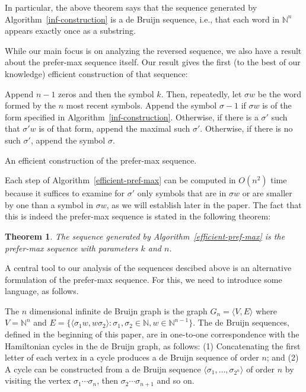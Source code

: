 \documentclass{article}
\newtheorem{theorem}{Theorem}
\theoremstyle{definition}
\newcommand{\N}{{\mathbb{N}}}
\newcommand{\T}[1]{\langle{#1}\rangle}
\begin{document}
In particular, the above theorem says that the sequence generated by Algorithm~\ref{inf-construction} is a de Bruijn sequence, i.e., that each word in $\N^n$ appears exactly once as a substring.

While our main focus is on analyzing the reversed sequence, we also have a result about the prefer-max sequence itself. Our result gives the first (to the best of our knowledge) efficient construction of that sequence:

\begin{algorithm}
	Append $n-1$ zeros and then the symbol $k$. Then, repeatedly, let $\sigma w$ be the word formed by the $n$ most recent symbols. Append the symbol $\sigma-1$  if $\sigma w$  is of the form specified in Algorithm~\ref{inf-construction}. Otherwise, if there is a  $\sigma'$ such that $\sigma'w$ is of that form, append the maximal such $\sigma'$. Otherwise, if there is no such $\sigma'$, append the symbol $\sigma$.
		
	\caption{An efficient construction of the prefer-max sequence.}
	\label{efficient-pref-max}
\end{algorithm}

Each step of Algorithm~\ref{efficient-pref-max} can be computed in $O(n^2)$ time because it suffices to examine for $\sigma'$ only symbols that are in $\sigma w$ or are smaller by one than a symbol in $\sigma w$, as we will establish later in the paper.
The fact that this is indeed the prefer-max sequence is stated in the following theorem:

\begin{theorem}
	The sequence generated by Algorithm~\ref{efficient-pref-max} is the prefer-max sequence with parameters $k$ and $n$.
\end{theorem}
	

A central tool to our analysis of the sequences descibed above is an alternative formulation of the prefer-max sequence. For this, we need to introduce some language, as follows.

The $n$ dimensional infinite de Bruijn graph is the graph $G_{n}=\T{V,E}$ where $V=\N^n$ and $E=\{ \T{\sigma_1 w, w \sigma_2} \colon \sigma_1,\sigma_2\in\N, w \in \N^{n-1}\}$. The de Bruijn sequences, defined in the beginning of this paper, are in one-to-one correspondence with the Hamiltonian cycles in the de Bruijn graph, as follows: (1) Concatenating the first letter of each vertex in a cycle produces a de Bruijn sequence of order $n$; and (2) A cycle can be constructed from a de Bruijn sequence $\T{\sigma_1,\dots,\sigma_{2^n}}$ of order $n$ by visiting the vertex $\sigma_1\cdots\sigma_n$, then $\sigma_2\cdots\sigma_{n+1}$ and so on.
\end{document}
